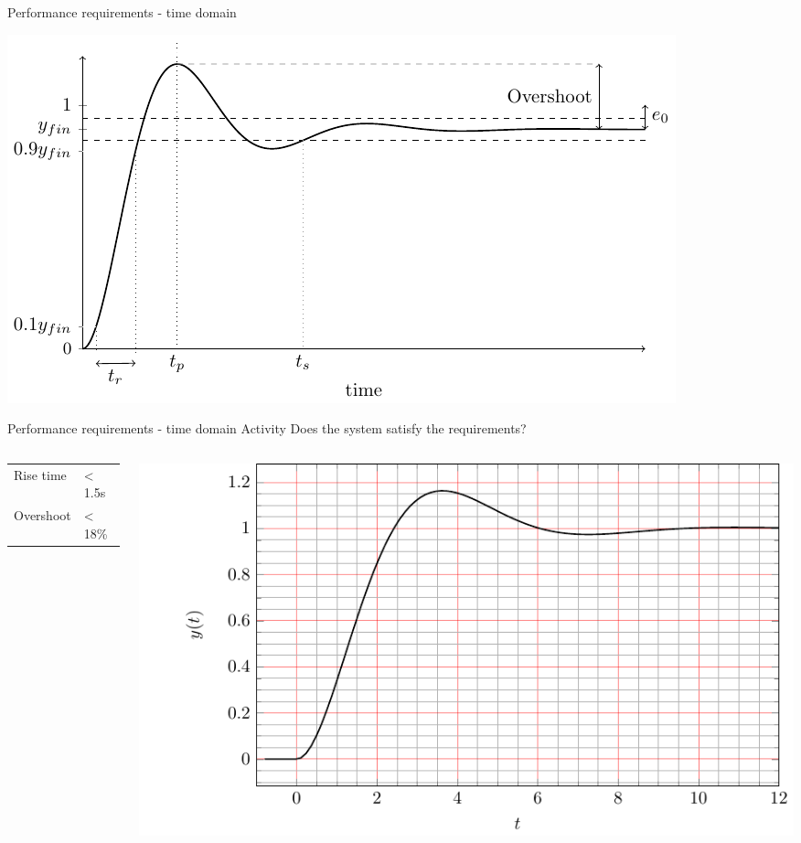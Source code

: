 \documentclass[presentation,aspectratio=169, usenames, dvipsnames]{beamer}
\begin{document}
\begin{frame}[label={sec:org3ac524b}]{Performance requirements - time domain}
\begin{center}
  \includegraphics[width=.8\linewidth]{../../figures/step-response-specifications}
\end{center}
\end{frame}


\begin{frame}[label={sec:orge17f11d}]{Performance requirements - time domain}
\alert{Activity} Does the system satisfy the requirements?

\begin{columns}
\begin{column}{0.3\columnwidth}
\begin{center}
\begin{tabular}{ll}
Rise time & < 1.5s\\
Overshoot & < 18\%\\
\end{tabular}
\end{center}
\end{column}


\begin{column}{0.7\columnwidth}
\begin{center}
 \includegraphics[width=1.0\linewidth]{../../figures/second-order-response-example}
\end{center}
\end{column}
\end{columns}
\end{frame}
\end{document}
